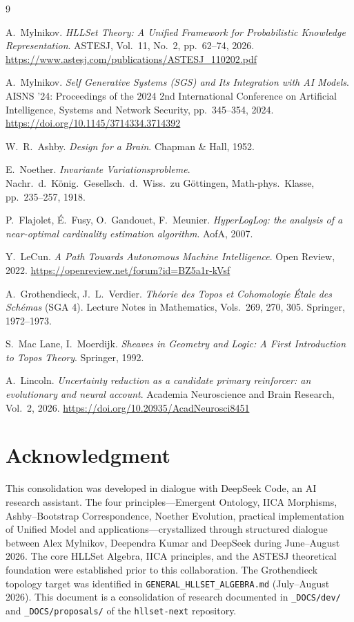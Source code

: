 \documentclass[11pt,a4paper]{article}
\theoremstyle{remark}
\begin{document}
\begin{thebibliography}{9}

A.~Mylnikov.
\emph{HLLSet Theory: A Unified Framework for Probabilistic Knowledge Representation}.
ASTESJ, Vol.~11, No.~2, pp.~62--74, 2026.
\url{https://www.astesj.com/publications/ASTESJ_110202.pdf}

A.~Mylnikov.
\emph{Self Generative Systems (SGS) and Its Integration with AI Models}.
AISNS '24: Proceedings of the 2024 2nd International Conference on Artificial
Intelligence, Systems and Network Security, pp.~345--354, 2024.
\url{https://doi.org/10.1145/3714334.3714392}

W.~R.~Ashby.
\emph{Design for a Brain}.
Chapman \& Hall, 1952.

E.~Noether.
\emph{Invariante Variationsprobleme}.
Nachr.~d.~K\"onig.~Gesellsch.~d.~Wiss.~zu G\"ottingen, Math-phys.~Klasse,
pp.~235--257, 1918.

P.~Flajolet, \'{E}.~Fusy, O.~Gandouet, F.~Meunier.
\emph{HyperLogLog: the analysis of a near-optimal cardinality estimation algorithm}.
AofA, 2007.

Y.~LeCun.
\emph{A Path Towards Autonomous Machine Intelligence}.
Open Review, 2022.
\url{https://openreview.net/forum?id=BZ5a1r-kVsf}

A.~Grothendieck, J.~L.~Verdier.
\emph{Th\'eorie des Topos et Cohomologie \'Etale des Sch\'emas} (SGA 4).
Lecture Notes in Mathematics, Vols.~269, 270, 305. Springer, 1972--1973.

S.~Mac Lane, I.~Moerdijk.
\emph{Sheaves in Geometry and Logic: A First Introduction to Topos Theory}.
Springer, 1992.

A.~Lincoln.
\emph{Uncertainty reduction as a candidate primary reinforcer: an evolutionary
and neural account}.
Academia Neuroscience and Brain Research, Vol.~2, 2026.
\url{https://doi.org/10.20935/AcadNeurosci8451}

\end{thebibliography}

\section*{Acknowledgment}
This consolidation was developed in dialogue with DeepSeek Code, an AI research
assistant. The four principles---Emergent Ontology, IICA Morphisms, Ashby--Bootstrap
Correspondence, Noether Evolution, practical implementation of Unified Model and applications---crystallized through structured dialogue between
Alex Mylnikov, Deependra Kumar and DeepSeek during June--August 2026. The core HLLSet Algebra, IICA
principles, and the ASTESJ theoretical foundation were established prior to this
collaboration. The Grothendieck topology target was identified in
\texttt{GENERAL\_HLLSET\_ALGEBRA.md} (July--August 2026). This document is a
consolidation of research documented in \texttt{\_DOCS/dev/} and
\texttt{\_DOCS/proposals/} of the \texttt{hllset-next} repository.
\end{document}
